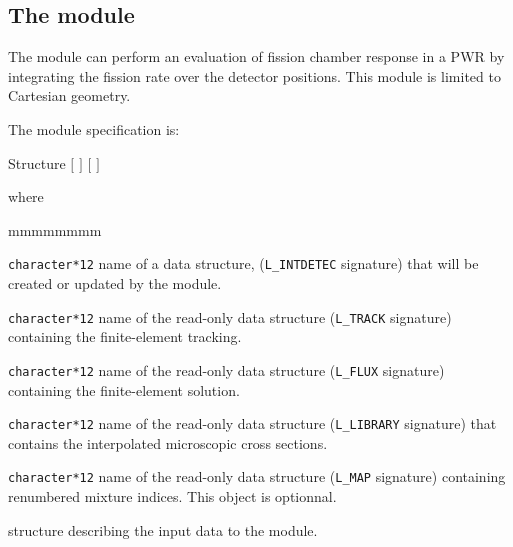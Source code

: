 \subsection{The  module}\label{sect:idet}

\vskip 0.2cm
The  module can perform an evaluation of fission chamber response in a PWR by integrating the fission rate over
the detector positions. This module is limited to Cartesian geometry.

\vskip 0.08cm
\noindent
The  module specification is:

\begin{DataStructure}{Structure }\label{table:tidet}
 \moc{:=}  $[$  $]$    $[$  $]$ \\
\moc{::} 
\end{DataStructure}

\noindent where

\begin{ListeDeDescription}{mmmmmmmm}

\item[\dusa{IDETEC}] {\tt character*12} name of a  data structure,
({\tt L\_INTDETEC} signature) that will be created or updated by the  module.

\item[\dusa{TRKNAM}] {\tt character*12} name of the read-only  data
structure ({\tt L\_TRACK} signature) containing the finite-element tracking.

\item[\dusa{FLUNAM}] {\tt character*12} name of the read-only  data
structure ({\tt L\_FLUX} signature) containing the finite-element solution.

\item[\dusa{LIBNAM}] {\tt character*12} name of the read-only 
data structure ({\tt L\_LIBRARY} signature) that contains the interpolated microscopic
cross sections.

\item[\dusa{FMAP}] \texttt{character*12} name of the read-only   data structure
({\tt L\_MAP} signature) containing renumbered mixture indices. This object is optionnal.

\item[\dstr{descidet}] structure describing the input data to the  module.

\end{ListeDeDescription}

